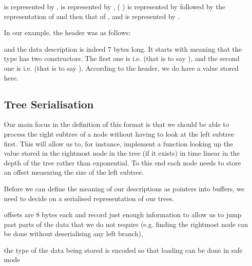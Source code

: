 is represented by ,
 is represented by ,
(  ) is represented by
 followed by the representation of  and then that of ,
and  is represented by .


In our example, the header was as follows:
\begin{hexdump}
 
\end{hexdump}
\noindent and the data description is indeed 7 bytes long. It starts with 
meaning that the type has two constructors.
The first one is  i.e.  (that is to say ),
and the second one is  i.e.
\IdrisKeyword{(} 
\IdrisKeyword{(}  \IdrisKeyword{))}
(that is to say ).
%
According to the header, we do have a  value stored here.

\subsection{Tree Serialisation}

Our main focus in the definition of this format is that we should be able
to process the right subtree of a node without having to look at the left
subtree first.
%
This will allow us to, for instance, implement a function looking up the
value stored in the rightmost node in the tree (if it exists) in time linear
in the depth of the tree rather than exponential.
%
To this end each node needs to store an offset measuring the size of the left subtree.

Before we can define the meaning of our descriptions as pointers
into buffers, we need to decide on a serialised representation of
our trees.



offsets are 8 bytes each and record just enough information to
allow us to jump past parts of the data that we do not require (e.g. finding
the rightmost node can be done without deserialising any left branch),

the type of the data being stored is encoded so that loading
can be done in safe mode
